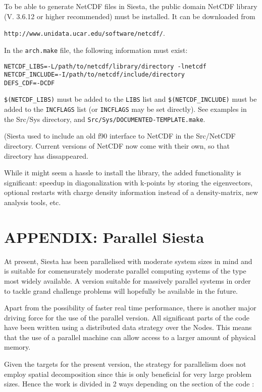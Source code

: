 \documentclass[11pt]{article}
\begin{document}
To be able to generate NetCDF files in {\sc Siesta}, the public domain
NetCDF library (V. 3.6.12 or higher recommended) must be installed. It can be
downloaded from

{\tt http://www.unidata.ucar.edu/software/netcdf/}.

In the {\tt arch.make} file, the following information must exist:
\begin{verbatim}
NETCDF_LIBS=-L/path/to/netcdf/library/directory -lnetcdf
NETCDF_INCLUDE=-I/path/to/netcdf/include/directory
DEFS_CDF=-DCDF
\end{verbatim}
{\tt \$(NETCDF\_LIBS)} must be added to the {\tt LIBS} list and
{\tt \$(NETCDF\_INCLUDE)} must be added to the {\tt INCFLAGS} list (or
{\tt INCFLAGS} may be set directly). See examples in the Src/Sys
directory, and {\tt Src/Sys/DOCUMENTED-TEMPLATE.make}.


({\sc Siesta} used to include an old f90 interface to NetCDF in the
Src/NetCDF directory. Current versions of NetCDF now come with their
own, so that directory has dissappeared.

While it might seem a hassle to install the library, the added
functionality is significant: speedup in diagonalization with k-points
by storing the eigenvectors, optional restarts with charge density
information instead of a density-matrix,  new analysis tools, etc.


\newpage
\section{APPENDIX: Parallel {\sc Siesta}}
\label{sec:parallel}

At present, {\sc Siesta} has been parallelised with moderate system sizes
in mind and is suitable for comensurately moderate parallel computing
systems of the type most widely available. A version suitable for
massively parallel systems in order to tackle grand challenge problems
will hopefully be available in the future.

Apart from the possibility of faster real time performance, there is
another major driving force for the use of the parallel version. All
significant parts of the code have been written using a distributed
data strategy over the Nodes. This means that the use of a parallel
machine can allow access to a larger amount of physical memory.

Given the targets for the present version, the strategy for parallelism
does not employ spatial decomposition since this is only beneficial for
very large problem sizes. Hence the work is divided in 2 ways depending
on the section of the code :
\end{document}
